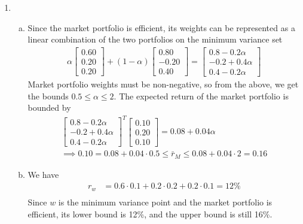 \documentclass{article}
\begin{document}
\begin{enumerate}
	\item 
		\begin{enumerate}[(a)]
			\item 	
				\begin{soln}
					Since the market portfolio is efficient, its weights can be represented as a linear combination of the two portfolios on the minimum variance set
					\begin{align*}
						\alpha\begin{bmatrix}
							0.60 \\ 0.20 \\ 0.20
						\end{bmatrix} + (1-\alpha)\begin{bmatrix}
							0.80 \\ -0.20 \\ 0.40
						\end{bmatrix} = \begin{bmatrix}
							0.8-0.2\alpha \\ -0.2+0.4\alpha \\ 0.4-0.2\alpha
						\end{bmatrix}
					\end{align*}
					Market portfolio weights must be non-negative, so from the above, we get the bounds $0.5\le \alpha \le 2.$ The expected return of the market portfolio is bounded by
					\begin{align*}
						\begin{bmatrix}
							0.8-0.2\alpha \\ -0.2+0.4\alpha \\ 0.4-0.2\alpha 
						\end{bmatrix}^T\begin{bmatrix}
							0.10 \\ 0.20 \\ 0.10
						\end{bmatrix} = 0.08 + 0.04\alpha \\
						\implies 0.10 = 0.08+0.04\cdot 0.5 \le \bar r_M \le 0.08 + 0.04\cdot 2 = 0.16
					\end{align*}
				\end{soln}

			\item 
				\begin{soln}
					We have 
					\begin{align*}
						r_w &= 0.6\cdot 0.1 + 0.2\cdot 0.2 + 0.2\cdot 0.1 = 12\% \\
					\end{align*}
					Since $w$ is the minimum variance point and the market portfolio is efficient, its lower bound is 12\%, and the upper bound is still 16\%.
				\end{soln}


\end{enumerate}
\end{enumerate}
\end{document}
